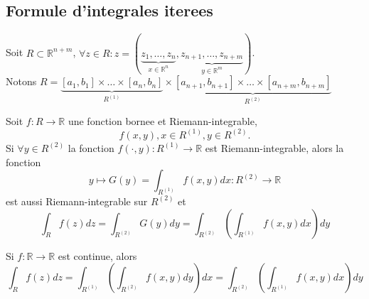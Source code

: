 \documentclass[../main.tex]{subfiles}
\begin{document}
\subsection{Formule d'integrales iterees}
Soit $R \subset \mathbb{R}^{n+m}$, $\forall z \in  R: z = ( \underbrace{ z_1, \ldots, z_n}_{x \in \mathbb{R}^{n}}, \underbrace{z_{n+1} , \ldots, z_{n+m}}_{y \in \mathbb{R}^{m}	} ) $.\\
Notons  $R = \underbrace{[ a_1, b_1] \times \ldots \times [ a_n,b_n] }_{R^{( 1) }}\times \underbrace{ [ a_{n+1} ,b_{n+1} ] \times \ldots \times [ a_{n+m} , b_{n+m}  ]  }_{R^{( 2) }}$
\begin{thm}[de Fubini]
	Soit $f : R \to \mathbb{R}$ une fonction bornee et Riemann-integrable, 
	\[ 
		f( x,y) , x \in R^{( 1) }, y \in R^{( 2) }.	
	\]
	Si $\forall y \in R^{( 2) }$ la fonction $f( \cdot, y) : R^{( 1) }\to \mathbb{R}$ est Riemann-integrable, alors la fonction
	\[ 
		y \mapsto G( y) = \int_{R^{( 1) }} f( x,y) dx: R^{( 2) }\to \mathbb{R}
	\]
	est aussi Riemann-integrable sur $R^{( 2) }$ et 
	\[ 
		\int_{R} f( z) dz = \int_{R^{( 2) }} G( y) dy = \int_{R^{( 2) }} ( \int_{R^{( 1) }} f( x,y) dx) dy	
	\]
\end{thm}
\begin{crly}
Si $f: \mathbb{R}\to \mathbb{R}$ est continue, alors
\[ 
	\int_R f( z) dz = \int_{R^{( 1) }} ( \int_{R^{( 2) }} f( x,y) dy) dx = \int_{R^{( 2) }} ( \int_{R^{( 1) }} f( x,y) dx) dy
\]

\end{crly}



	


		
\end{document}
